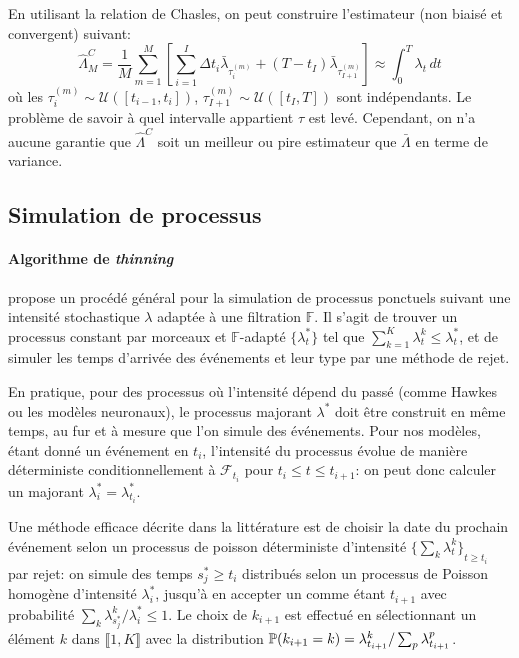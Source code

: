 \documentclass[../main.tex]{subfiles}
\begin{document}
En utilisant la relation de Chasles, on peut construire l'estimateur (non biaisé et convergent) suivant:
\begin{equation}
\hat{\Lambda}_M^C = \frac{1}{M}\sum_{m=1}^{M}\left[ \sum_{i=1}^{I} \Delta t_i \bar\lambda_{\tau^{(m)}_i} + (T-t_{I}) \bar\lambda_{\tau^{(m)}_{I+1}}\right]
\approx
\int_0^T \lambda_t\,dt
\end{equation}
où les $\tau_i^{(m)}\sim\mathcal{U}([t_{i-1}, t_i])$, $\tau_{I+1}^{(m)}\sim\mathcal{U}([t_I, T])$ sont indépendants. Le problème de savoir à quel intervalle appartient $\tau$ est levé. Cependant, on n'a aucune garantie que $\hat{\Lambda}^C$ soit un meilleur ou pire estimateur que $\bar{\Lambda}$ en terme de variance.

\subsection{Simulation de processus}\label{ssec:thinning}

\paragraph{Algorithme de \textit{thinning}} \citeauthor{ogata1981} propose un procédé général pour la simulation de processus ponctuels suivant une intensité stochastique $\lambda$ adaptée à une filtration $\mathds{F}$. Il s'agit de trouver un processus constant par morceaux et $\mathds{F}$-adapté $\{\lambda_t^*\}$ tel que $\sum_{k=1}^{K}\lambda^k_t \leq \lambda_t^*$, et de simuler les temps d'arrivée des événements et leur type par une méthode de rejet. \autocite{ogata1981}

En pratique, pour des processus où l'intensité dépend du passé (comme Hawkes ou les modèles neuronaux), le processus majorant $\lambda^*$ doit être construit en même temps, au fur et à mesure que l'on simule des événements. Pour nos modèles, étant donné un événement en $t_i$, l'intensité du processus évolue de manière déterministe conditionnellement à $\mathcal{F}_{t_i}$ pour $t_i\leq t\leq t_{i+1}$: on peut donc calculer un majorant $\lambda_i^* = \lambda^*_{t_i}$.

Une méthode efficace décrite dans la littérature est de choisir la date du prochain événement selon un processus de poisson déterministe d'intensité ${\{\sum_k\lambda^k_t\}}_{t\geq t_i}$ par rejet: on simule des temps $s_j^*\geq t_i$ distribués selon un processus de Poisson homogène d'intensité $\lambda_i^*$, jusqu'à en accepter un comme étant $t_{i+1}$ avec probabilité $\sum_k\lambda^k_{s_j^*}/\lambda^*_{i} \leq 1$. Le choix de $k_{i+1}$ est effectué en sélectionnant un élément $k$ dans $\llbracket 1,K\rrbracket$ avec la distribution $\mathbb{P}(k_{i+1} = k) = \lambda^{k}_{t_{i+1}}/\sum_p \lambda^p_{t_{i+1}}$. \cite{meiEisnerNeuralHawkes,ogata1981}
\end{document}
